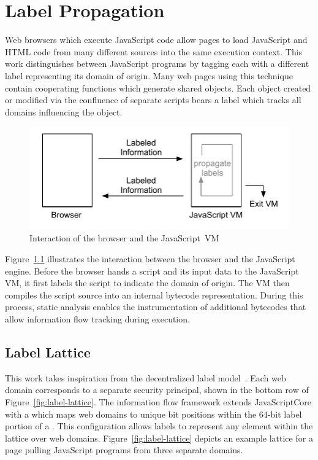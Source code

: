 
\chapter{Label Propagation}
\label{ch:label-propagation}

Web browsers which execute JavaScript code allow pages to load JavaScript and HTML code from many different sources into the same execution context.
This work distinguishes between JavaScript programs by tagging each with a different label representing its domain of origin.
Many web pages using this technique contain cooperating functions which generate shared objects.
Each object created or modified via the confluence of separate scripts bears a label which tracks all domains influencing the object.

\begin{figure}[ht]
  \centerline{\includegraphics[keepaspectratio=true]{images/browserinteraction.pdf}}
  \caption{Interaction of the browser and the JavaScript~VM}
  \label{fig:browserinteraction}
\end{figure}

Figure~\ref{fig:browserinteraction} illustrates the interaction between the browser and the JavaScript engine.
Before the browser hands a script and its input data to the JavaScript VM, it first labels the script to indicate the domain of origin.
The VM then compiles the script source into an internal bytecode representation.
During this process, static analysis enables the instrumentation of additional bytecodes that allow information flow tracking during execution.

\section{Label Lattice}

This work takes inspiration from the decentralized label model~\cite{myers.liskov+00}.
Each web domain corresponds to a separate security principal, shown in the bottom row of Figure~\ref{fig:label-lattice}.
The information flow framework extends JavaScriptCore with a  which maps web domains to unique bit positions within the 64-bit label portion of a .
This configuration allows labels to represent any element within the lattice over web domains.
Figure~\ref{fig:label-lattice} depicts an example lattice for a page pulling JavaScript programs from three separate domains.

